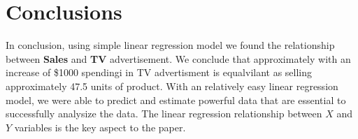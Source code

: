 \documentclass{article}
\begin{document}
\section{Conclusions}

In conclusion, using simple linear regression model we found the relationship between \textbf{Sales} and \textbf{TV} advertisement. We conclude that approximately with an increase of \$1000 spendingi in TV advertisment is equalvilant as selling approximately 47.5 units of product. With an relatively easy linear regression model, we were able to predict and estimate powerful data that are essential to successfully analysize the data. The linear regression relationship between $X$ and $Y$ variables is the key aspect to the paper. 
\end{document}
